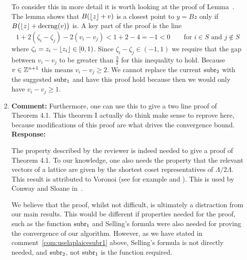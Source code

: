 \documentclass[a4paper,10pt]{article}
\begin{document}
\begin{enumerate}
To consider this in more detail it is worth looking at the proof of Lemma~.  The lemma shows that $B({\left\lfloor z \right\rfloor} + v)$ is a closest point to $y = Bz$ only if $B\big({\left\lfloor z \right\rfloor} + \operatorname{decrng}(v)\big)$ is.  A key part of the proof is the line
\[
1 + 2(\zeta_i-\zeta_j) - 2(v_i - v_j) < 1 + 2 - 4 = -1 < 0 \qquad \text{for $i \in S$ and $j \notin S$}
\]
where $\zeta_i = z_i - {\left\lfloor z_i \right\rfloor} \in [0,1)$.  Since $\zeta_i-\zeta_j \in (-1,1)$ we require that the gap between $v_i - v_j$ to be greater than $\tfrac{3}{2}$ for this inequality to hold.  Because $v \in {\mathbb Z}^{n+1}$ this means $v_i - v_j \geq 2$.  We cannot replace the current $\operatorname{subr}_2$ with the suggested $\operatorname{subr}_1$ and have this proof hold because then we would only have $v_i - v_j \geq 1$.


\item\textbf{Comment:} \label{com:provethm4.1}
Furthermore, one can use this to give a two line proof of Theorem 4.1.  This theorem I actually do think make sense to reprove here, because modifications of this proof are what drives the convergence bound. 
\\\textbf{Response:}

The property described by the reviewer is indeed needed to give a proof of Theorem 4.1.  To our knowledge, one also needs the property that the relevant vectors of a lattice are given by the shortest coset representatives of $\Lambda / 2\Lambda$.  This result is attributed to Voronoi (see for example \cite[Theorem~2]{ConwaySloane1992_voronoi_lattice_3d_obtuse_superbases} and \cite[Theorem~3.2]{MicciancioVoulgaris_deterministic_jv_2013}).  This is used by Conway and Sloane in~\cite[Theorem~3]{ConwaySloane1992_voronoi_lattice_3d_obtuse_superbases}.

We believe that the proof, whilst not difficult, is ultimately a distraction from our main results.  This would be different if properties needed for the proof, such as the function $\operatorname{subr}_1$ and Selling's formula were also needed for proving the convergence of our algorithm.  However, as we have stated in comment~\ref{com:uselaplaicesubr1} above, Selling's formula is not directly needed, and $\operatorname{subr}_2$, not $\operatorname{subr}_1$ is the function required. 


\end{enumerate}
\end{document}
